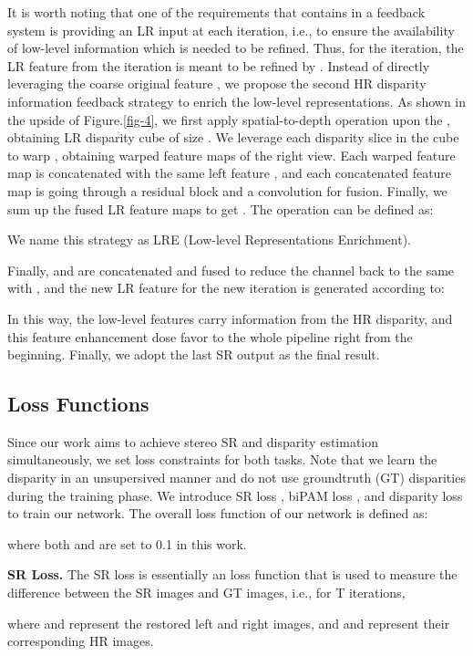 \documentclass[sigconf]{acmart}
\begin{document}
It is worth noting that one of the requirements that contains in a feedback system is providing an LR input at each iteration, i.e., to ensure the availability of low-level information which is needed to be refined. Thus, for the  iteration, the LR feature  from the  iteration is meant to be refined by . Instead of directly leveraging the coarse original feature , we propose the second HR disparity information feedback strategy to enrich the low-level representations. As shown in the upside of Figure.\ref{fig-4}, we first apply spatial-to-depth operation upon the , obtaining LR disparity cube of size . We leverage each disparity slice in the cube to warp , obtaining  warped feature maps of the right view. Each warped feature map is concatenated with the same left feature , and each concatenated feature map is going through a residual block and a  convolution for fusion. Finally, we sum up the  fused LR feature maps to get . The operation can be defined as:

We name this strategy as LRE (Low-level Representations Enrichment).

Finally,  and  are concatenated and fused to reduce the channel back to the same with , and the new LR feature  for the new iteration is generated according to:



In this way, the low-level features  carry information from the HR disparity, and this feature enhancement dose favor to the whole pipeline right from the beginning. Finally, we adopt the last SR output as the final result.

\subsection{Loss Functions}\label{loss}
Since our work aims to achieve stereo SR and disparity estimation simultaneously, we set loss constraints for both tasks. Note that we learn the disparity in an unsupersived manner and do not use groundtruth (GT) disparities during the training phase. We introduce SR loss , biPAM loss , and disparity loss  to train our network. The overall loss function of our network is defined as:

where both  and  are set to 0.1 in this work.

\textbf{SR Loss.}
The SR loss is essentially an  loss function that is used to measure the difference between the SR images and GT images, i.e., for T iterations, 

where  and  represent the restored left and right images, and  and  represent their corresponding HR images.
\end{document}
